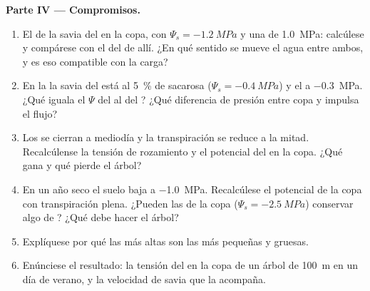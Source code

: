 \begin{problem}
\medskip
\noindent\textbf{Parte IV --- Compromisos.}
\begin{enumerate}[resume]
  \item El  de la savia del  en la copa, con
        $\Psi_s = \qty{-1.2}{MPa}$ y una  de \qty{1.0}{MPa}:
        calcúlese y compárese con el del  de allí. ¿En qué sentido se
        mueve el agua entre ambos, y es eso compatible con la carga?
  \item En la  la savia del  está al \qty{5}{\%} de sacarosa
        ($\Psi_s =
        \qty{-0.4}{MPa}$) y el  a \qty{-0.3}{MPa}. ¿Qué
         iguala el $\Psi$ del  al del ? ¿Qué diferencia
        de presión entre copa y  impulsa el flujo?
  \item Los  se cierran a mediodía y la transpiración se reduce a la
        mitad. Recalcúlense la tensión de rozamiento y el potencial del
         en la copa. ¿Qué gana y qué pierde el árbol?
  \item En un año seco el suelo baja a \qty{-1.0}{MPa}. Recalcúlese el
        potencial de la copa con transpiración plena. ¿Pueden las  de
        la copa ($\Psi_s = \qty{-2.5}{MPa}$) conservar algo de ?
        ¿Qué debe hacer el árbol?
  \item Explíquese por qué las  más altas son las más pequeñas y
        gruesas.
  \item Enúnciese el resultado: la tensión del  en la copa de un árbol
        de \qty{100}{m} en un día de verano, y la velocidad de savia que la
        acompaña.
\end{enumerate}
\end{problem}
